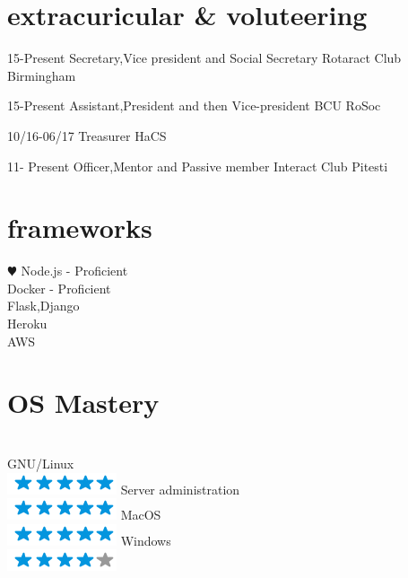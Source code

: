 \documentclass[]{friggeri-cv}
\begin{document}
\section{extracuricular \& voluteering}
\begin{entrylist}

    \entry
    {15-Present}
    {Secretary,Vice president and Social Secretary}
    {Rotaract Club Birmingham}
    ~
    
    \entry
    {15-Present}
    {Assistant,President and then Vice-president}
    {BCU RoSoc}
    
    
     \entry
    {10/16-06/17}
    {Treasurer}
    {HaCS}
    ~ 
    
    \entry
    {11- Present}
    {Officer,Mentor and Passive member}
    {Interact Club Pitesti}
    ~
    
   
    
    
    
\end{entrylist}


\newpage

\begin{aside2}
  \section{frameworks}
    {\color{red} $\varheartsuit$} 
    Node.js - Proficient \\
    Docker - Proficient \\
    Flask,Django \\
    Heroku \\
    AWS \\
    
  \section{OS Mastery}
  \\GNU/Linux  \\\includegraphics[scale=0.30]{img/5stars.png}
  Server administration \\\includegraphics[scale=0.30]{img/5stars.png}
  MacOS  \\\includegraphics[scale=0.30]{img/5stars.png}
  Windows  \\\includegraphics[scale=0.30]{img/4stars.png}
\end{aside2}
\end{document}
